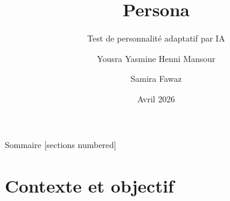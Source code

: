 \documentclass[aspectratio=169]{beamer}
\title{Persona}
\subtitle{Test de personnalité adaptatif par IA}
\author{Yousra Yasmine Henni Mansour \and Samira Fawaz}
\institute{UE TPALT --- Sorbonne Sciences}
\date{Avril 2026}
\begin{document}
\maketitle

\begin{frame}{Sommaire}
  [sections numbered]
  \tableofcontents[hideallsubsections]
\end{frame}


\section{Contexte et objectif}
\end{document}
